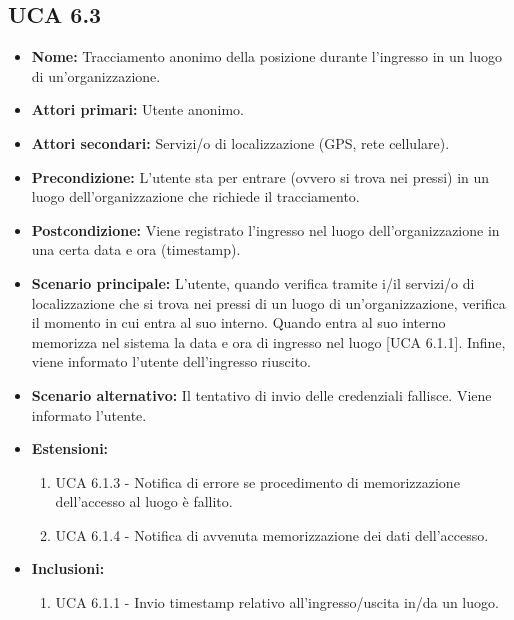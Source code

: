 \subsection{UCA 6.3}%
\begin{itemize}
	\item \textbf{Nome:} Tracciamento anonimo della posizione durante l'ingresso in un luogo di un'organizzazione.
	\item \textbf{Attori primari:} Utente anonimo.
	\item \textbf{Attori secondari:} Servizi/o di localizzazione (GPS, rete cellulare).
	\item \textbf{Precondizione:} L'utente sta per entrare (ovvero si trova nei pressi) in un luogo dell'organizzazione che richiede il tracciamento.
	\item \textbf{Postcondizione:} Viene registrato l'ingresso nel luogo dell'organizzazione in una certa data e ora (timestamp).
	\item \textbf{Scenario principale:} L'utente, quando verifica tramite i/il servizi/o di localizzazione che si trova nei pressi di un luogo di un'organizzazione, verifica il momento in cui entra al suo interno.
	Quando entra al suo interno memorizza nel sistema la data e ora di ingresso nel luogo [UCA 6.1.1].
	Infine, viene informato l'utente dell'ingresso riuscito.
	\item \textbf{Scenario alternativo:} Il tentativo di invio delle credenziali fallisce. Viene informato l'utente.
	\item \textbf{Estensioni:}
	\begin{enumerate}
		\item UCA 6.1.3 - Notifica di errore se procedimento di memorizzazione dell'accesso al luogo è fallito.
		\item UCA 6.1.4 - Notifica di avvenuta memorizzazione dei dati dell'accesso.
	\end{enumerate}
	\item \textbf{Inclusioni:}
	\begin{enumerate}
		\item UCA 6.1.1 - Invio timestamp relativo all'ingresso/uscita in/da un luogo.
	\end{enumerate}
\end{itemize}


